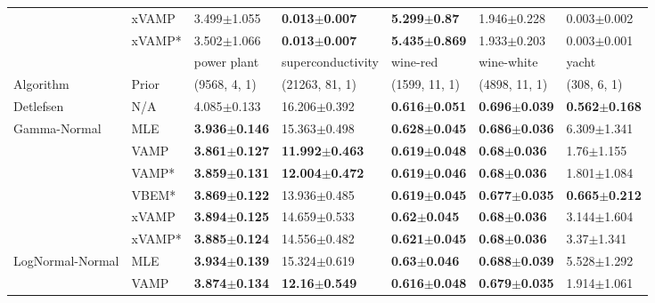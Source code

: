 \begin{tabular}{lllllll}
                 & xVAMP &           3.499$\pm$1.055 &  \textbf{0.013$\pm$0.007} &   \textbf{5.299$\pm$0.87} &           1.946$\pm$0.228 &           0.003$\pm$0.002 \\
                 & xVAMP* &           3.502$\pm$1.066 &  \textbf{0.013$\pm$0.007} &  \textbf{5.435$\pm$0.869} &           1.933$\pm$0.203 &           0.003$\pm$0.001 \\
\midrule
                 &        &               power plant &          superconductivity &                  wine-red &                wine-white &                     yacht \\
Algorithm & Prior& (9568, 4, 1)& (21263, 81, 1)& (1599, 11, 1)& (4898, 11, 1)& (308, 6, 1)\\
\midrule
Detlefsen & N/A &           4.085$\pm$0.133 &           16.206$\pm$0.392 &  \textbf{0.616$\pm$0.051} &  \textbf{0.696$\pm$0.039} &  \textbf{0.562$\pm$0.168} \\
Gamma-Normal & MLE &  \textbf{3.936$\pm$0.146} &           15.363$\pm$0.498 &  \textbf{0.628$\pm$0.045} &  \textbf{0.686$\pm$0.036} &           6.309$\pm$1.341 \\
                 & VAMP &  \textbf{3.861$\pm$0.127} &  \textbf{11.992$\pm$0.463} &  \textbf{0.619$\pm$0.048} &   \textbf{0.68$\pm$0.036} &            1.76$\pm$1.155 \\
                 & VAMP* &  \textbf{3.859$\pm$0.131} &  \textbf{12.004$\pm$0.472} &  \textbf{0.619$\pm$0.046} &   \textbf{0.68$\pm$0.036} &           1.801$\pm$1.084 \\
                 & VBEM* &  \textbf{3.869$\pm$0.122} &           13.936$\pm$0.485 &  \textbf{0.619$\pm$0.045} &  \textbf{0.677$\pm$0.035} &  \textbf{0.665$\pm$0.212} \\
                 & xVAMP &  \textbf{3.894$\pm$0.125} &           14.659$\pm$0.533 &   \textbf{0.62$\pm$0.045} &   \textbf{0.68$\pm$0.036} &           3.144$\pm$1.604 \\
                 & xVAMP* &  \textbf{3.885$\pm$0.124} &           14.556$\pm$0.482 &  \textbf{0.621$\pm$0.045} &   \textbf{0.68$\pm$0.036} &            3.37$\pm$1.341 \\
LogNormal-Normal & MLE &  \textbf{3.934$\pm$0.139} &           15.324$\pm$0.619 &   \textbf{0.63$\pm$0.046} &  \textbf{0.688$\pm$0.039} &           5.528$\pm$1.292 \\
                 & VAMP &  \textbf{3.874$\pm$0.134} &   \textbf{12.16$\pm$0.549} &  \textbf{0.616$\pm$0.048} &  \textbf{0.679$\pm$0.035} &           1.914$\pm$1.061 \\

\end{tabular}
